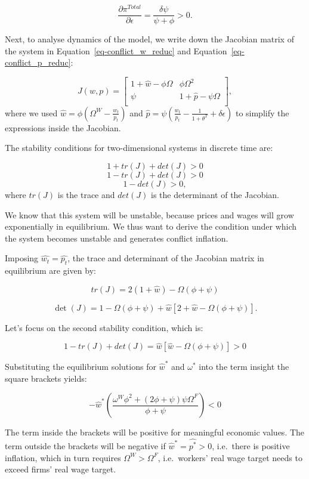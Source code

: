\documentclass[
  letterpaper,
  DIV=11,
  numbers=noendperiod]{scrreprt}
\begin{document}
\[
\frac{\partial \pi^{Total}}{\partial \epsilon} =  \frac{\delta \psi }{\psi + \phi} > 0.
\]

Next, to analyse dynamics of the model, we write down the Jacobian
matrix of the system in Equation~\ref{eq-conflict_w_reduc} and
Equation~\ref{eq-conflict_p_reduc}:

\[
J(w,p)=\begin{bmatrix}
            1 + \hat{w} - \phi \Omega & \phi {\Omega}^2   \\
            \psi & 1 + \hat{p} - \psi \Omega   \\
        \end{bmatrix},
\] where we used \(\hat{w}=\phi\left(\Omega^W - \frac{w_t}{p_t}\right)\)
and
\(\hat{p}=\psi\left(\frac{w_t}{p_t} - \frac{1}{1+\theta^T} + \delta \epsilon \right)\)
to simplify the expressions inside the Jacobian.

The stability conditions for two-dimensional systems in discrete time
are:

\[
1+tr(J)+det(J)>0
\] \[
1-tr(J)+det(J)>0
\] \[
1-det(J)>0,
\] where \(tr(J)\) is the trace and \(det(J)\) is the determinant of the
Jacobian.

We know that this system will be unstable, because prices and wages will
grow exponentially in equilibrium. We thus want to derive the condition
under which the system becomes unstable and generates conflict
inflation.

Imposing \(\hat{w_t}=\hat{p_t}\), the trace and determinant of the
Jacobian matrix in equilibrium are given by:

\[
tr(J)=2(1+\hat{w}) - \Omega(\phi+\psi)
\]

\begin{equation}

\det(J)=1-\Omega(\phi+\psi)+\hat{w}[2+\hat{w} - \Omega(\phi+\psi)].

\end{equation}

Let's focus on the second stability condition, which is:

\[
1-tr(J)+det(J)= \hat{w}[\hat{w} - \Omega(\phi+\psi)]>0
\]

Substituting the equilibrium solutions for \(\hat{w}^*\) and
\(\omega^*\) into the term insight the square brackets yields:

\[
-\hat{w}^*\left(\frac{\omega^W\phi^2+(2\phi+\psi)\psi \Omega^F}{\phi+\psi}\right)<0
\]

The term inside the brackets will be positive for meaningful economic
values. The term outside the brackets will be negative if
\(\hat{w}^*=\hat{p^*}>0\), i.e.~there is positive inflation, which in
turn requires \(\Omega^W > \Omega^F\), i.e.~workers' real wage target
needs to exceed firms' real wage target.
\end{document}
